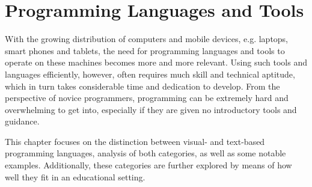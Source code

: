 \chapter{Programming Languages and Tools}
\label{chap:languages_and_tools}

With the growing distribution of computers and mobile devices, e.g. laptops, smart phones and tablets, the need for programming languages and tools to operate on these machines becomes more and more relevant. Using such tools and languages efficiently, however, often requires much skill and technical aptitude, which in turn takes considerable time and dedication to develop. From the perspective of novice programmers, programming can be extremely hard and overwhelming to get into, especially if they are given no introductory tools and guidance.

This chapter focuses on the distinction between visual- and text-based programming languages, analysis of both categories, as well as some notable examples. Additionally, these categories are further explored by means of how well they fit in an educational setting.   



